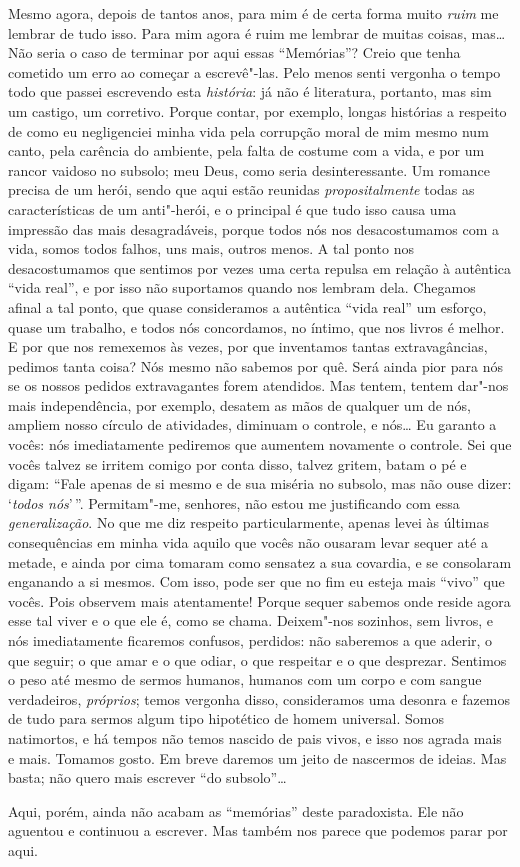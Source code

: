 Mesmo agora, depois de tantos anos, para mim é de certa forma muito
\textit{ruim} me lembrar de tudo isso. Para mim agora é ruim me lembrar
de muitas coisas, mas\ldots{} Não seria o caso de terminar por aqui essas
“Memórias”? Creio que tenha cometido um erro ao começar a escrevê"-las.
Pelo menos senti vergonha o tempo todo que passei escrevendo esta
\textit{história}: já não é literatura, portanto, mas sim um castigo,
um corretivo. Porque contar, por exemplo, longas histórias a respeito
de como eu negligenciei minha vida pela corrupção moral de mim mesmo
num canto, pela carência do ambiente, pela falta de costume com a vida,
e por um rancor vaidoso no subsolo; meu Deus, como seria
desinteressante. Um romance precisa de um herói, sendo que aqui estão
reunidas \textit{propositalmente} todas as características de um
anti"-herói, e o principal é que tudo isso causa uma impressão das mais
desagradáveis, porque todos nós nos desacostumamos com a vida, somos
todos falhos, uns mais, outros menos. A tal ponto nos desacostumamos que
sentimos por vezes uma certa repulsa em relação à autêntica “vida
real”, e por isso não suportamos quando nos lembram dela. Chegamos
afinal a tal ponto, que quase consideramos a autêntica “vida real” um
esforço, quase um trabalho, e todos nós concordamos, no íntimo, que nos
livros é melhor. E por que nos remexemos às vezes, por que inventamos
tantas extravagâncias, pedimos tanta coisa? Nós mesmo não sabemos por
quê. Será ainda pior para nós se os nossos pedidos extravagantes forem
atendidos. Mas tentem, tentem dar"-nos mais independência, por exemplo,
desatem as mãos de qualquer um de nós, ampliem nosso círculo de
atividades, diminuam o controle, e nós\ldots{} Eu garanto a vocês: nós
imediatamente pediremos que aumentem novamente o controle. Sei que
vocês talvez se irritem comigo por conta disso, talvez gritem, batam o
pé e digam: “Fale apenas de si mesmo e de sua miséria no subsolo, mas
não ouse dizer: ‘\textit{todos nós}’\,”. Permitam"-me,
senhores, não estou me justificando com essa \textit{generalização}. No
que me diz respeito particularmente, apenas levei às últimas
consequências em minha vida aquilo que vocês não ousaram levar sequer
até a metade, e ainda por cima tomaram como sensatez a sua covardia, e
se consolaram enganando a si mesmos. Com isso, pode ser que no fim eu
esteja mais “vivo” que vocês. Pois observem mais atentamente! Porque
sequer sabemos onde reside agora esse tal viver e o que ele é, como se
chama. Deixem"-nos sozinhos, sem livros, e nós imediatamente ficaremos
confusos, perdidos: não saberemos a que aderir, o que seguir; o que
amar e o que odiar, o que respeitar e o que desprezar. Sentimos o peso
até mesmo de sermos humanos, humanos com um corpo e com sangue
verdadeiros, \textit{próprios}; temos vergonha disso, consideramos uma
desonra e fazemos de tudo para sermos algum tipo hipotético de homem
universal. Somos natimortos, e há tempos não temos nascido de pais
vivos, e isso nos agrada mais e mais. Tomamos gosto. Em breve daremos
um jeito de nascermos de ideias. Mas basta; não quero mais escrever “do
subsolo”\ldots{}

Aqui, porém, ainda não acabam as “memórias” deste paradoxista. Ele não
aguentou e continuou a escrever. Mas também nos parece que podemos
parar por aqui.



